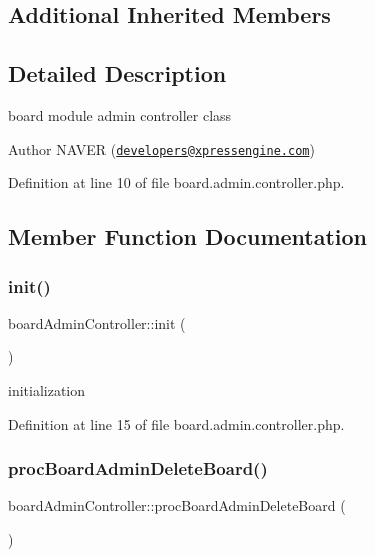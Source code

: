 \subsection*{Additional Inherited Members}


\subsection{Detailed Description}
board module admin controller class 

\begin{DoxyAuthor}{Author}
N\+A\+V\+ER (\href{mailto:developers@xpressengine.com}{\tt developers@xpressengine.\+com}) 
\end{DoxyAuthor}


Definition at line 10 of file board.\+admin.\+controller.\+php.



\subsection{Member Function Documentation}
\hypertarget{classboardAdminController_a9e73a19f4dd17efa11a5c1340448c75f}{}\label{classboardAdminController_a9e73a19f4dd17efa11a5c1340448c75f} 
\subsubsection{\texorpdfstring{init()}{init()}}
{\footnotesize\ttfamily board\+Admin\+Controller\+::init (\begin{DoxyParamCaption}{ }\end{DoxyParamCaption})}



initialization 



Definition at line 15 of file board.\+admin.\+controller.\+php.

\hypertarget{classboardAdminController_a1a29957a0a3b7751bff0969dfeae966a}{}\label{classboardAdminController_a1a29957a0a3b7751bff0969dfeae966a} 
\subsubsection{\texorpdfstring{proc\+Board\+Admin\+Delete\+Board()}{procBoardAdminDeleteBoard()}}
{\footnotesize\ttfamily board\+Admin\+Controller\+::proc\+Board\+Admin\+Delete\+Board (\begin{DoxyParamCaption}{ }\end{DoxyParamCaption})}



